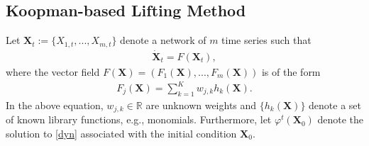 \subsection{Koopman-based Lifting Method}
Let $\textbf{X}_t:=\{X_{1,t}, ..., X_{m,t}\}$ denote a network of $m$ time series such that 
\begin{align}\label{dyn}
\dot{\textbf{X}}_t = F(\textbf{X}_t),
\end{align}
where the vector field $F(\textbf{X})=(F_1(\textbf{X}),...,F_m(\textbf{X}))$ is of the form
\begin{align}
F_j(\textbf{X})= \sum_{k=1}^K w_{j,k} h_k(\textbf{X}).
\end{align}
In the above equation, $w_{j,k}\in\mathbb{R}$ are unknown weights and $\{h_k(\textbf{X})\}$ denote a set of known library functions, e.g., monomials. 
Furthermore, let $\varphi^t(\textbf{X}_0)$ denote the solution to \eqref{dyn} associated with the initial condition $\textbf{X}_0$. 

